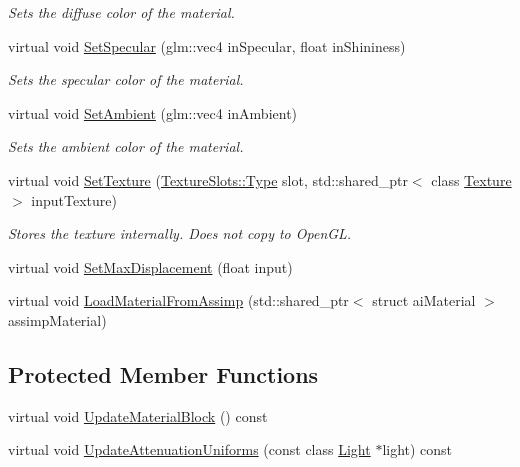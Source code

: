 \begin{DoxyCompactItemize}
\begin{DoxyCompactList}\small\item\em Sets the diffuse color of the material. \end{DoxyCompactList}\item 
virtual void \hyperlink{class_blinn_phong_shader_a6567423da36050cc1567919707e8be72}{Set\+Specular} (glm\+::vec4 in\+Specular, float in\+Shininess)
\begin{DoxyCompactList}\small\item\em Sets the specular color of the material. \end{DoxyCompactList}\item 
virtual void \hyperlink{class_blinn_phong_shader_a0f8c1c478525dd662922597ea7d9c4ac}{Set\+Ambient} (glm\+::vec4 in\+Ambient)
\begin{DoxyCompactList}\small\item\em Sets the ambient color of the material. \end{DoxyCompactList}\item 
virtual void \hyperlink{class_blinn_phong_shader_aa9c8908b300ce1451887945fb961d3b2}{Set\+Texture} (\hyperlink{struct_blinn_phong_shader_1_1_texture_slots_a98940b49ba855ee47d61a6243c05c34d}{Texture\+Slots\+::\+Type} slot, std\+::shared\+\_\+ptr$<$ class \hyperlink{class_texture}{Texture} $>$ input\+Texture)
\begin{DoxyCompactList}\small\item\em Stores the texture internally. Does not copy to Open\+GL. \end{DoxyCompactList}\item 
virtual void \hyperlink{class_blinn_phong_shader_acbef23fe1f5ea72a10dc6ded656dacf0}{Set\+Max\+Displacement} (float input)
\item 
virtual void \hyperlink{class_blinn_phong_shader_a5a2a720a403f3d005b07a96fee35b95b}{Load\+Material\+From\+Assimp} (std\+::shared\+\_\+ptr$<$ struct ai\+Material $>$ assimp\+Material)
\end{DoxyCompactItemize}
\subsection*{Protected Member Functions}
\begin{DoxyCompactItemize}
\item 
virtual void \hyperlink{class_blinn_phong_shader_aa247270120b46431b436220ea6e777be}{Update\+Material\+Block} () const
\item 
virtual void \hyperlink{class_blinn_phong_shader_a389b3b5fea85eb6deedfc028c4140632}{Update\+Attenuation\+Uniforms} (const class \hyperlink{class_light}{Light} $\ast$light) const
\end{DoxyCompactItemize}
